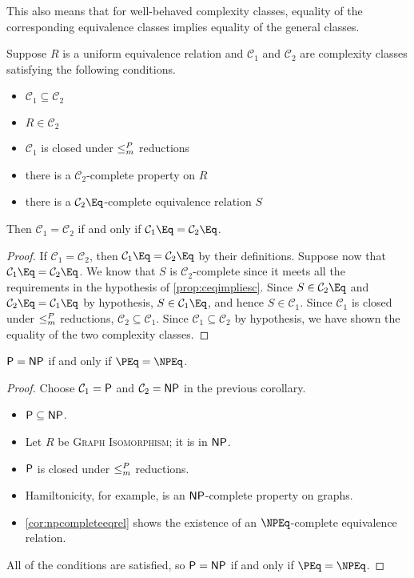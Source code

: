 This also means that for well-behaved complexity classes, equality of the corresponding equivalence classes implies equality of the general classes.

\begin{proposition}
  Suppose $R$ is a uniform equivalence relation and $\mathcal{C}_1$ and $\mathcal{C}_2$ are complexity classes satisfying the following conditions.
  \begin{itemize}
  \item $\mathcal{C}_1 \subseteq \mathcal{C}_2$
  \item $R \in \mathcal{C}_2$
  \item $\mathcal{C}_1$ is closed under $\mor$ reductions
  \item there is a $\mathcal{C}_2$-complete property on $R$
  \item there is a $\mathcal{C}_2\Eq$-complete equivalence relation $S$
  \end{itemize}
  Then $\mathcal{C}_1 = \mathcal{C}_2$ if and only if $\mathcal{C}_1\Eq = \mathcal{C}_2\Eq$.
\end{proposition}
\begin{proof}
  If $\mathcal{C}_1 = \mathcal{C}_2$, then $\mathcal{C}_1\Eq = \mathcal{C}_2\Eq$ by their definitions.
  Suppose now that $\mathcal{C}_1\Eq = \mathcal{C}_2\Eq$.
  We know that $S$ is $\mathcal{C}_2$-complete since it meets all the requirements in the hypothesis of \autoref{prop:ceqimpliesc}.
  Since $S \in \mathcal{C}_2\Eq$ and $\mathcal{C}_2\Eq = \mathcal{C}_1\Eq$ by hypothesis, $S \in \mathcal{C}_1\Eq$, and hence $S \in \mathcal{C}_1$.
  Since $\mathcal{C}_1$ is closed under $\mor$ reductions, $\mathcal{C}_2 \subseteq \mathcal{C}_1$.
  Since $\mathcal{C}_1 \subseteq \mathcal{C}_2$ by hypothesis, we have shown the equality of the two complexity classes.
\end{proof}

\begin{corollary}\label{cor:pnppeqnpeq}
  $\P = \NP$ if and only if $\PEq = \NPEq$.
\end{corollary}
\begin{proof}
  Choose $\mathcal{C}_1 = \P$ and $\mathcal{C}_2 = \NP$ in the previous corollary.
  \begin{itemize}
  \item $\P \subseteq \NP$.
  \item Let $R$ be \textsc{Graph Isomorphism}; it is in $\NP$.
  \item $\P$ is closed under $\mor$ reductions.
  \item Hamiltonicity, for example, is an $\NP$-complete property on graphs.
  \item \autoref{cor:npcompleteeqrel} shows the existence of an $\NPEq$-complete equivalence relation.
  \end{itemize}
  All of the conditions are satisfied, so $\P = \NP$ if and only if $\PEq = \NPEq$.
\end{proof}

